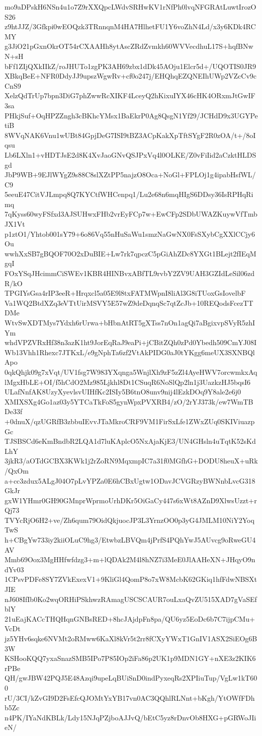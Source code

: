 mo9aDPskH6NSn4u1o7Z9rXXQpcLWdvSRHwKV1rNfPh0lvqNFGRAtLuwtIrozOS26
z9htJJZ/3Gfkpi0wEOQzk3TRnnqnM4HA7HlhetFU1Y6voZhN4Ld/x3y6KDk4RCMY
g3JiO21pGxnOkrOT54rCXAAHh8ytAscZRdZvmkh60WVVecdhuL17S+hqfBNwN+sH
bFf1ZIjQXkIIkZ/roJHUTo1zgPK3AH69zbx1dDk45AOju1Elcr5d+/UQOTIS0JR9
XBkqBeE+NFR0DdyJJ9upszWgwRv+cf0o247j/EHQhqEZQNEIhUWp2VZcCv9cCnS9
XelzQdTrUp7bpn3DiG7phZwwRcXIKF4LceyQ2hKixuIYX46cHK4ORxmJtGwIF3sa
PHkjSuf+OqHPZZngh3cBKhcYMsx1BaEkrP0Ag8QsgN1Yf29/JCHdD9x3UGYPetiB
8WVqNAK6Vnu1wUBt84GpjDeG7ISI9tBZ3ACpKakXpTftSYgF2R0zOA/t+/8oIqsu
Lb6LXln1+vHDTJsE2d8K4XvJaoGNvQSJPxVq4l0OLKE/Z0vFiIid2aCzktHLDSgd
JbP9WB+9EJlWYgZ9s88C8slXZtPP5najzO8Oca+NoGl+FPLOj1g4ipabHsfWL/C9
5eeuE47CitVJLmpq8Q7KYCtfWHCenpq1/Lu2e68n6mqHIgS6DDsy36IsRPHqRimq
7qKyss60wyFSfxd3AJSUHwxFHb2vrEyFCp7w+EwCFp2SDbUWAZKuywVfTmbJX1Vt
p1ztO1/Yhtob001sY79+6o86Vq55nHuSaWu1smzNaGwNX0FsSXybCgXXlCCjy6Ou
wwhXxSB7gBQOF70O2xDuBIE+Lw7rk7qpczC5pGiAhZDc8YXGt1BLejt2fIEqMgqI
FOxYSqJHcimmCiSWEv1KBR4HINBvxABfTL9rvbY2ZV9UAH3GZIdLeSil06zdR/kO
TPGIYsGsa4rIP3eeR+Hrqxcl5a05E9l8txFATMWpnI8liAl3G8iTUoxGsIovelbF
Va1WQ2BtdXZq3eVTtUirMSVY5E57wZ9deDqnqSc7qtZcJb+10REQodsFcezTTDMe
WtvSwXDTMys7Ydxh6rUrwa+bHbnAtRT5gXTss7nOn1agQi7aBgixvpSVyR5zhIYm
whdVPZVRxHf38n3azK1ht9JorEqRaJ9eaPi+jCBitZQh0zPd0Ybedh509CmYJ08I
Wb13Vhh1Rhexc7JTKxL/e9gNphTa6zf2VtAkPIDG0aJ0tYKgg6meUX3SXNBQlApo
0qkQhjk09g7xVqt/UV1fsg7W983YXqnga5WnjlXh9zF5zZl4AyeHWV7orcwmkxAq
lMgxHbLE+OI/f5hCdO2Mz985Ljkhl8Dt1CSuqR6NoSlQp2ln1j3UazkzHJ5bqsI6
ULafNnfAK8UzyXyevlsvUIHfKc2ISIy5B6tnO8unv9nij4lEzkDOq9Y8ale2e6j0
XMIXSXg4Go1az03y5YTCaTkFoS5gynWpxPVXRB4/zO/2rYJ373k/ew7WmTBDe33f
+0dnuX/qzUGRfB3zbbuIEvvJTaMkroCRF9VM1FirSxLfe1ZWxZUq0SKIViuazpGc
TJSBSCd6eKmBndbR2LQA1d7luKAplcO5NxAjaKjE3/UN4GHsln4uTqtK52sKdLhY
3jkR3/aOTdGCBX3KWk1j2rZoRN9MqxmpIC7a31f0MGfhG+DODU8heuX+uRk/QxOm
a+cc3zdux5ALgJ04O7pLvYPZa0E6hCBxUgtw1ODavJCVGRzyBWNnbLvcG318GkJr
gxW1YHmr0GH90GMnprWprmoUrhDKr5OiGaCy447s6xWt8AZnD9XlwsUzzt+rQj73
TVYcRjO6H2+ve/Zh6qum79OidQkjuocJP3L3YrnzOO0p3yG4JMLM10NiY2YoqTwS
h+CBgYw733iy2kiiOLuC9hg3/EtwbzLBVQm4jPrfS4PQhYwJ5AUvcg9oRweGU4AV
Mmb69Oox3MgHHfwfdzg3+m+lQDAk2M4l8hNZ7i3MeE0JlAAHeXN+JHqyO9ndYv03
1CPsvPDFe8SY7ZVkExexV1+9KliGl4QomP8o7xW8McbK62GKiq1hfFdwNBSXtJIE
nJ608IfIb0Ko2wqORHiPSkhwzRAmagUSCSCAUR7ouLxaQvZU515XAD7gVaSEfblY
21uEajKACcTHQHqnGNBsRED+8hcJAjdpFn8pa/QU6yz5EoDc6b7C7ijpCMu+VcDt
jz5YHv6sqke6NVMt2oRMww6KaXl8kVr5t2rr8fCXyYWxT1GnIV1ASX2SiEOg6B3W
KSHooKQQ7yxaSnazSMB5IPo7P85IOp2iFa86p2UK1p9MDN1GY+nXE3z2KIK6rPBe
QH/gwJBW42PQJ5E48Azqi9upeLqBUiSnD0indPyxeqRs2XPIiuTup/VgLw1kT600
rU/3CI/kZvGI9D2FsEfcQJOMtYxYB17vn0AC3QQhlRLNnt+bKgh/YtOWfFDhb5Zc
n4PK/IYaNdKBLk/Ldy15NJqPZjboAJJvQ/bEtC5yz8rDnvOb8HXG+pGRWoJIieN/
